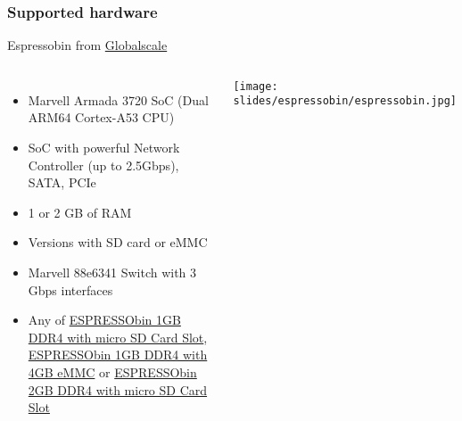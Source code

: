 \begin{frame}
\frametitle{Supported hardware}
  Espressobin from
\href{https://espressobin.net/}{Globalscale}
  \begin{columns}
    \footnotesize
    \begin{itemize}
      \item Marvell Armada 3720 SoC (Dual ARM64 Cortex-A53 CPU)
      \item SoC with powerful Network Controller (up to 2.5Gbps), SATA, PCIe
      \item 1 or 2 GB of RAM
      \item Versions with SD card or eMMC
      \item Marvell 88e6341 Switch with 3 Gbps interfaces
      \item Any of
        \href{https://globalscaletechnologies.com/product/espressobin/}{ESPRESSObin
          1GB DDR4 with micro SD Card Slot},
        \href{https://globalscaletechnologies.com/product/espressobin-1gb-ddr4-with-4gb-emmc/}{ESPRESSObin
          1GB DDR4 with 4GB eMMC} or
        \href{https://globalscaletechnologies.com/product/espressobin-2gb-msd-card-slot/}{ESPRESSObin
          2GB DDR4 with micro SD Card Slot}
    \end{itemize}
    \begin{center}
      \texttt{[image: slides/espressobin/espressobin.jpg]}
    \end{center}
  \end{columns}
\end{frame}
